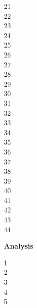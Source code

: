 21 \\


22 \\


23 \\


24 \\


25 \\


26 \\


27 \\


28 \\


29 \\


30 \\


31 \\


32 \\


33 \\


34 \\


35 \\


36 \\


37 \\


38 \\


39 \\


40 \\


41 \\


42 \\


43 \\


44 \\


\newpage

\textbf{Analysis}

1 \\


2 \\


3 \\


4 \\


5 \\


